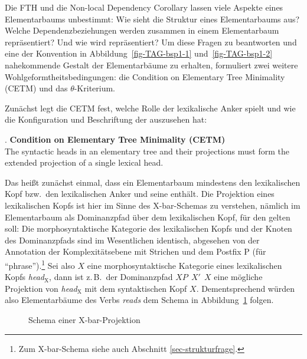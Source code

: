 Die FTH und die Non-local Dependency Corollary lassen viele Aspekte eines Elementarbaums unbestimmt: Wie sieht die Struktur eines Elementarbaums aus? Welche Dependenzbeziehungen werden zusammen in einem Elementarbaum repräsentiert? Und wie wird  repräsentiert?  Um diese Fragen zu beantworten und eine der Konvention in Abbildung~\ref{fig-TAG-bsp1-1} und~\ref{fig-TAG-bsp1-2} nahekommende Gestalt der Elementarbäume zu erhalten, formuliert \cite{Frank:02} zwei weitere Wohlgeformtheitsbedingungen: die Condition on Elementary Tree Minimality (CETM) und das $\theta$-Kriterium. 

Zunächst legt die CETM fest, welche Rolle der lexikalische Anker spielt und wie die Konfiguration und Beschriftung der  auszusehen hat:

\ex. {\bf Condition on Elementary Tree Minimality (CETM)} \label{ex-cetm} \\
The syntactic heads in an elementary tree and their projections must form the extended projection of a single lexical head.
\citep[54]{Frank:02}

Das hei\ss t zunächst einmal, dass ein Elementarbaum mindestens den lexikalischen Kopf bzw.\ den lexikalischen Anker und seine  enthält. Die Projektion eines lexikalischen Kopfs ist hier im Sinne des X-bar-Schemas \citep{Chomsky:70} zu verstehen, nämlich im Elementarbaum als Dominanzpfad über dem lexikalischen Kopf, für den gelten soll: Die morphosyntaktische Kategorie des lexikalischen Kopfs und der Knoten des Dominanzpfads sind im Wesentlichen identisch, abgesehen von der Annotation der Komplexitätsebene mit Strichen und dem Postfix P (für "`phrase"').\footnote{Zum X-bar-Schema siehe auch Abschnitt \ref{sec-strukturfrage}.} Sei also $X$ eine morphosyntaktische Kategorie eines lexikalischen Kopfs {\it head$_{\text{X}}$}, dann ist z.\,B.\ der Dominanzpfad $X\!P ~~ X' ~~ X$ eine mögliche Projektion von {\it head$_{\text{X}}$} mit dem syntaktischen Kopf $X$. Dementsprechend würden also Elementarbäume des Verbs \textit{reads} dem Schema in Abbildung~\ref{fig-cetm-1} folgen.
 
\begin{figure}[t]
\centering
{}
\caption{\label{fig-cetm-1}Schema einer X-bar-Projektion}
\end{figure}

